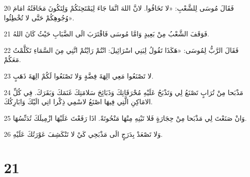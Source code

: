 \par 20 فَقَالَ مُوسَى لِلشَّعْبِ: «لا تَخَافُوا. لانَّ اللهَ انَّمَا جَاءَ لِيَمْتَحِنَكُمْ وَلِتَكُونَ مَخَافَتُهُ امَامَ وُجُوهِكُمْ حَتَّى لا تُخْطِئُوا».
\par 21 فَوَقَفَ الشَّعْبُ مِنْ بَعِيدٍ وَامَّا مُوسَى فَاقْتَرَبَ الَى الضَّبَابِ حَيْثُ كَانَ اللهُ.
\par 22 فَقَالَ الرَّبُّ لِمُوسَى: «هَكَذَا تَقُولُ لِبَنِي اسْرَائِيلَ: انْتُمْ رَايْتُمْ انَّنِي مِنَ السَّمَاءِ تَكَلَّمْتُ مَعَكُمْ.
\par 23 لا تَصْنَعُوا مَعِي الِهَةَ فِضَّةٍ وَلا تَصْنَعُوا لَكُمْ الِهَةَ ذَهَبٍ.
\par 24 مَذْبَحا مِنْ تُرَابٍ تَصْنَعُ لِي وَتَذْبَحُ عَلَيْهِ مُحْرَقَاتِكَ وَذَبَائِحَ سَلامَتِكَ غَنَمَكَ وَبَقَرَكَ. فِي كُلِّ الامَاكِنِ الَّتِي فِيهَا اصْنَعُ لاسْمِي ذِكْرا اتِي الَيْكَ وَابَارِكُكَ.
\par 25 وَانْ صَنَعْتَ لِي مَذْبَحا مِنْ حِجَارَةٍ فَلا تَبْنِهِ مِنْهَا مَنْحُوتَةً. اذَا رَفَعْتَ عَلَيْهَا ازْمِيلَكَ تُدَنِّسُهَا.
\par 26 وَلا تَصْعَدْ بِدَرَجٍ الَى مَذْبَحِي كَيْ لا تَنْكَشِفَ عَوْرَتُكَ عَلَيْهِ.

\chapter{21}


